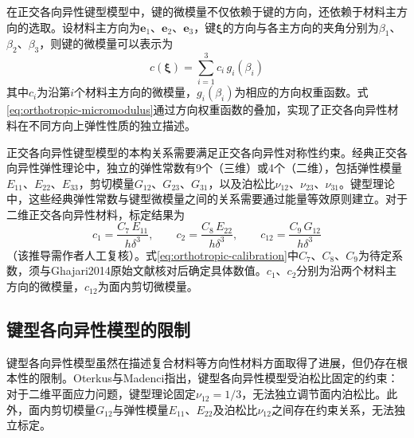 在正交各向异性键型模型中，键的微模量不仅依赖于键的方向，还依赖于材料主方向的选取。设材料主方向为$\mathbf{e}_{1}$、$\mathbf{e}_{2}$、$\mathbf{e}_{3}$，键$\boldsymbol{\xi}$的方向与各主方向的夹角分别为$\beta_{1}$、$\beta_{2}$、$\beta_{3}$，则键的微模量可以表示为
\begin{equation}
  c(\boldsymbol{\xi})=\sum_{i=1}^{3}c_{i}\,g_{i}(\beta_{i})
  \label{eq:orthotropic-micromodulus}
\end{equation}
其中$c_{i}$为沿第$i$个材料主方向的微模量，$g_{i}(\beta_{i})$为相应的方向权重函数。式\eqref{eq:orthotropic-micromodulus}通过方向权重函数的叠加，实现了正交各向异性材料在不同方向上弹性性质的独立描述。

正交各向异性键型模型的本构关系需要满足正交各向异性对称性约束。经典正交各向异性弹性理论中，独立的弹性常数有9个（三维）或4个（二维），包括弹性模量$E_{11}$、$E_{22}$、$E_{33}$，剪切模量$G_{12}$、$G_{23}$、$G_{31}$，以及泊松比$\nu_{12}$、$\nu_{23}$、$\nu_{31}$。键型理论中，这些经典弹性常数与键型微模量之间的关系需要通过能量等效原则建立。对于二维正交各向异性材料，标定结果为
\begin{equation}
  c_{1}=\frac{C_{7}\,E_{11}}{h\delta^{3}},\qquad c_{2}=\frac{C_{8}\,E_{22}}{h\delta^{3}},\qquad c_{12}=\frac{C_{9}\,G_{12}}{h\delta^{3}}
  \label{eq:orthotropic-calibration}
\end{equation}
（该推导需作者人工复核）。式\eqref{eq:orthotropic-calibration}中$C_{7}$、$C_{8}$、$C_{9}$为待定系数，须与Ghajari2014原始文献核对后确定具体数值。$c_{1}$、$c_{2}$分别为沿两个材料主方向的微模量，$c_{12}$为面内剪切微模量。


\subsection{键型各向异性模型的限制}\label{sec:anisotropic-limit}

键型各向异性模型虽然在描述复合材料等方向性材料方面取得了进展，但仍存在根本性的限制。Oterkus与Madenci\cite{OterkusMadenci2012}指出，键型各向异性模型受泊松比固定的约束：对于二维平面应力问题，键型理论固定$\nu_{12}=1/3$，无法独立调节面内泊松比。此外，面内剪切模量$G_{12}$与弹性模量$E_{11}$、$E_{22}$及泊松比$\nu_{12}$之间存在约束关系，无法独立标定。


